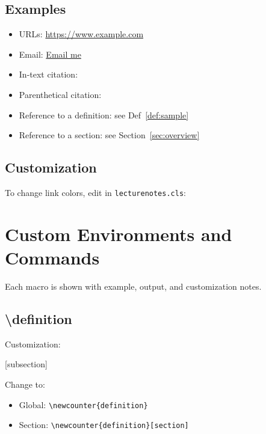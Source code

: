 \documentclass{lecturenotes}
\begin{document}
\subsection*{Examples}
\begin{itemize}
    \item URLs: \url{https://www.example.com} 
    \item Email: \href{mailto:someone@example.com}{Email me}
    \item In-text citation: \citet{goodfellow2016deep}
    \item Parenthetical citation: \citep{goodfellow2016deep}  
    \item Reference to a definition: see Def~\ref{def:sample}
    \item Reference to a section: see Section~\ref{sec:overview}
\end{itemize}

\subsection*{Customization}
To change link colors, edit in \texttt{lecturenotes.cls}:
\begin{codeblock}
\hypersetup{
    colorlinks,
    citecolor=teal,    %
    linkcolor=blue,    %
    urlcolor=magenta   %
}
\end{codeblock}


\newpage
\section{Custom Environments and Commands}

Each macro is shown with example, output, and customization notes.

\subsection{\textbackslash definition}
\begin{codeblock}
\end{codeblock}


Customization:
\begin{codeblock}
[subsection]
\renewcommand{\thedefinition}{\thesubsection.\arabic{definition}}
\end{codeblock}
Change to:
\begin{itemize}
\item Global: \verb|\newcounter{definition}|
\item Section: \verb|\newcounter{definition}[section]|
\end{itemize}
\end{document}
